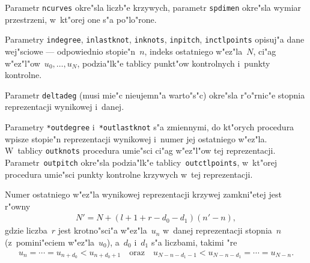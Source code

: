 Parametr \texttt{ncurves} okre"sla liczb"e krzywych, parametr \texttt{spdimen}
okre"sla wymiar przestrzeni, w~kt"orej one s"a po"lo"rone.

Parametry \texttt{indegree},
\texttt{inlastknot}, \texttt{inknots}, \texttt{inpitch}, \texttt{inctlpoints}
opisuj"a dane wej"sciowe --- odpowiednio stopie"n~$n$, indeks ostatniego
w"ez"la~$N$, ci"ag w"ez\-"l"ow~$u_0,\ldots,u_N$, podzia"lk"e tablicy
punkt"ow kontrolnych i~punkty kontrolne.

Parametr \texttt{deltadeg} (musi mie"c nieujemn"a warto"s"c) okre"sla
r"o"rnic"e stopnia reprezentacji wynikowej i~danej.

Parametry \texttt{*outdegree} i~\texttt{*outlastknot} s"a zmiennymi,
do kt"orych procedura wpisze stopie"n reprezentacji wynikowej
i~numer jej ostatniego w"ez"la. W~tablicy \texttt{outknots}
procedura umie"sci ci"ag w"ez"l"ow tej reprezentacji.
Parametr~\texttt{outpitch} okre"sla podzia"lk"e tablicy~\texttt{outctlpoints},
w~kt"orej procedura
umie"sci punkty kontrolne krzywych w~tej reprezentacji.

Numer ostatniego w"ez"la wynikowej reprezentacji krzywej zamkni"etej jest
r"owny
\begin{align*}
  N' = N+(l+1+r-d_0-d_1)(n'-n),
\end{align*}
gdzie liczba~$r$ jest krotno"sci"a w"ez"la~$u_n$ w~danej reprezentacji
stopnia~$n$ (z~pomini"eciem w"ez"la~$u_0$), a~$d_0$ i~$d_1$ s"a liczbami,
takimi "re
\begin{align*}
  u_n=\cdots=u_{n+d_0}<u_{n+d_0+1}\quad\mbox{oraz}\quad
  u_{N-n-d_1-1}<u_{N-n-d_1}=\cdots=u_{N-n}.
\end{align*}

